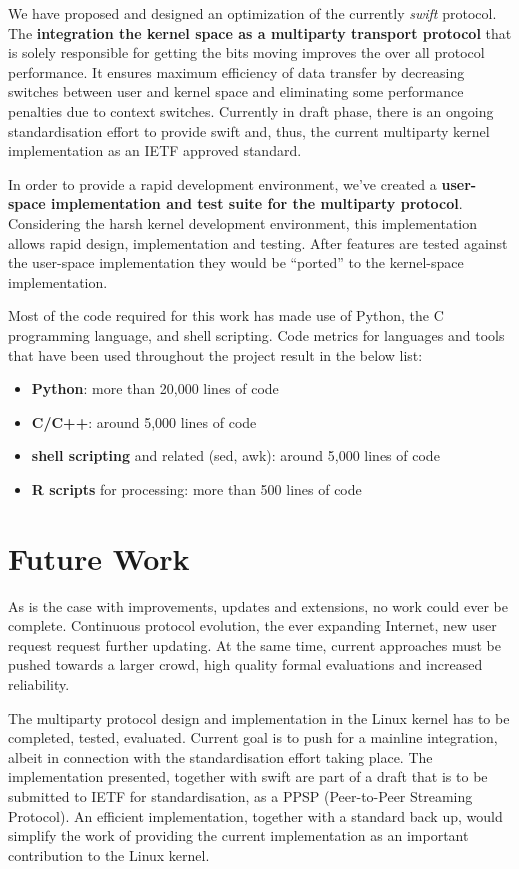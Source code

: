 We have proposed and designed an optimization of the currently \textit{swift}
protocol. The \textbf{integration the kernel space as a multiparty transport
protocol} that is solely responsible for getting the bits moving improves the
over all protocol performance. It ensures maximum efficiency of data transfer
by decreasing switches between user and kernel space and eliminating some
performance penalties due to context switches. Currently in draft phase,
there is an ongoing standardisation effort to provide swift and, thus, the
current multiparty kernel implementation as an IETF approved standard.

In order to provide a rapid development environment, we've created a
\textbf{user-space implementation and test suite for the multiparty protocol}.
Considering the harsh kernel development environment, this implementation
allows rapid design, implementation and testing. After features are tested
against the user-space implementation they would be ``ported'' to the
kernel-space implementation.

Most of the code required for this work has made use of Python, the C
programming language, and shell scripting. Code metrics for languages and
tools that have been used throughout the project result in the below list:

\begin{itemize}
  \item \textbf{Python}: more than 20,000 lines of code
  \item \textbf{C/C++}: around 5,000 lines of code
  \item \textbf{shell scripting} and related (sed, awk): around 5,000 lines
  of code
  \item \textbf{R scripts} for processing: more than 500 lines of code
\end{itemize}

\section{Future Work}
\label{sec:conclusion:future}

As is the case with improvements, updates and extensions, no work could ever
be complete. Continuous protocol evolution, the ever expanding Internet, new
user request request further updating. At the same time, current approaches
must be pushed towards a larger crowd, high quality formal evaluations and
increased reliability.

The multiparty protocol design and implementation in the Linux kernel has to
be completed, tested, evaluated. Current goal is to push for a mainline
integration, albeit in connection with the standardisation effort taking
place. The implementation presented, together with swift are part of a draft
that is to be submitted to IETF for standardisation, as a PPSP (Peer-to-Peer
Streaming Protocol). An efficient implementation, together with a standard
back up, would simplify the work of providing the current implementation as an
important contribution to the Linux kernel.

